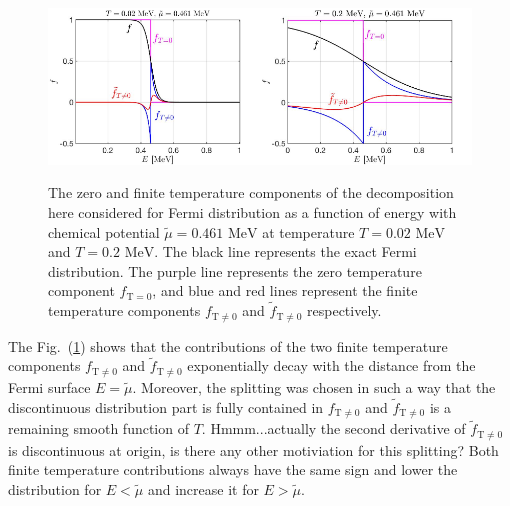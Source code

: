 \documentclass[sn-mathphys,Numbered]{sn-jnl}
\newcommand*{\MeV}{\text{ MeV}}
\newcommand{\rev}[1]{{\color{blue}#1}}
\begin{document}
\begin{figure}[ht]
\centering
\includegraphics[width=0.5\textwidth]{./plot/FermiZeorFiniteTemperature}\includegraphics[width=0.5\textwidth]{./plot/FermiZeroFiniteTemperature002}
\caption{%
The zero and finite temperature components of the decomposition here considered for Fermi distribution as a function of energy with chemical potential $\widetilde\mu=0.461\MeV$ at temperature $T=0.02\MeV$ and $T=0.2\MeV$. The black line represents the exact Fermi distribution. The purple line represents the zero temperature component $f_{\mathrm{T}=0}$, and blue and red lines represent the finite temperature components $f_\mathrm{T\neq0}$ and $\tilde f_\mathrm{T\neq0}$ respectively. }
\label{Fermi_Component}
\end{figure}

The Fig.~(\ref{Fermi_Component}) shows that \rev{the contributions of the two finite temperature components $f_\mathrm{T\neq0}$ and $\tilde f_\mathrm{T\neq0}$ exponentially decay with the distance from the Fermi surface $E=\tilde{\mu}$. Moreover, the splitting was chosen in such a way that the discontinuous distribution part is fully contained in $f_\mathrm{T\neq 0}$ and $\tilde{f}_\mathrm{T\neq 0}$ is a remaining smooth function of $T$. Hmmm...actually the second derivative of $\tilde{f}_\mathrm{T\neq 0}$ is discontinuous at origin, is there any other motiviation for this splitting?}  Both finite temperature contributions always have the same sign \rev{and lower the distribution for $E < \tilde{\mu}$ and increase it for $E > \tilde{\mu}$}.
\end{document}
